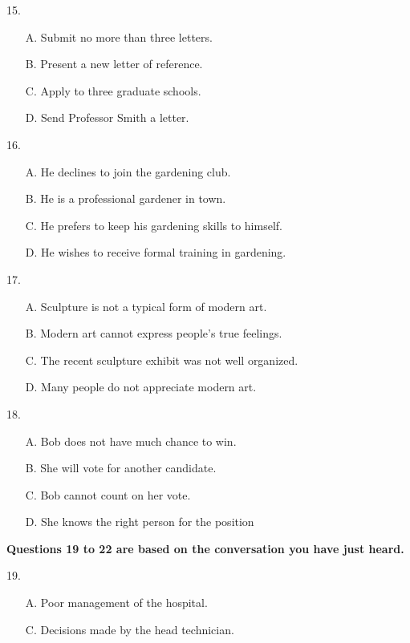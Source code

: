 \documentclass[UTF8,11pt]{ctexart}
\begin{document}
15.


\begin{itemize}[leftmargin=2em,itemsep=.2em,topsep=.4em]\item[A.] Submit no more than three letters.
\item[B.] Present a new letter of reference.
\item[C.] Apply to three graduate schools.
\item[D.] Send Professor Smith a letter.
\end{itemize}

16.


\begin{itemize}[leftmargin=2em,itemsep=.2em,topsep=.4em]\item[A.] He declines to join the gardening club.
\item[B.] He is a professional gardener in town.
\item[C.] He prefers to keep his gardening skills to himself.
\item[D.] He wishes to receive formal training in gardening.
\end{itemize}

17.


\begin{itemize}[leftmargin=2em,itemsep=.2em,topsep=.4em]\item[A.] Sculpture is not a typical form of modern art.
\item[B.] Modern art cannot express people's true feelings.
\item[C.] The recent sculpture exhibit was not well organized.
\item[D.] Many people do not appreciate modern art.
\end{itemize}

18.


\begin{itemize}[leftmargin=2em,itemsep=.2em,topsep=.4em]\item[A.] Bob does not have much chance to win.
\item[B.] She will vote for another candidate.
\item[C.] Bob cannot count on her vote.
\item[D.] She knows the right person for the position
\end{itemize}

\textbf{Questions 19 to 22 are based on the conversation you have just heard.}


19.


\begin{itemize}[leftmargin=2em,itemsep=.2em,topsep=.4em]\item[A.] Poor management of the hospital.
\item[C.] Decisions made by the head technician.
\end{itemize}
\end{document}

